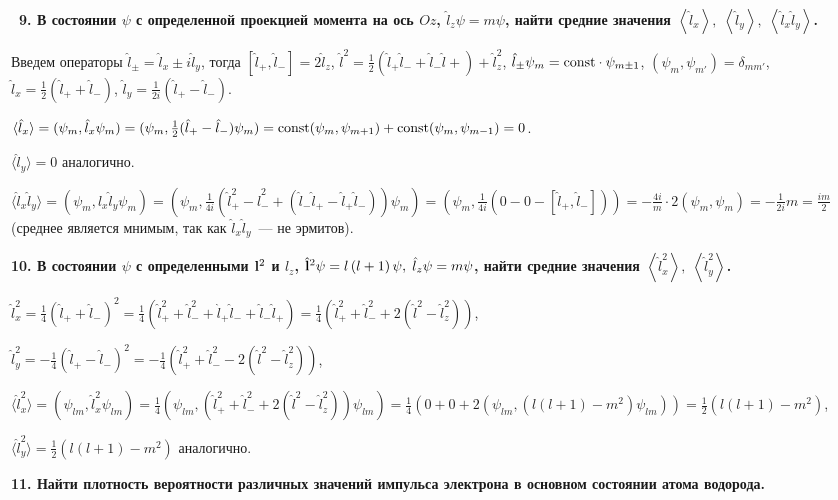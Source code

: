 \documentclass[a4paper,12pt]{article}
\begin{document}
\noindent\textbf{~9. В состоянии $\psi $ с определенной проекцией момента
на ось $Oz$, $\hat{l}_z \psi = m\psi$, найти средние значения
$\left\langle {\hat {l}_x } \right\rangle ,\;\left\langle {\hat
{l}_y } \right\rangle ,\;\left\langle {\hat {l}_x \hat {l}_y }
\right\rangle $.}

Введем операторы $\hat l_\pm=\hat l_x\pm i\hat l_y$, тогда
$[\hat l_+,\hat l_-]=2\hat l_z$,
$\hat l^2=\frac12(\hat l_+\hat l_-+\hat l_-\hat l+)+\hat l_z^2$,
$\hat l_\pm\psi_m=\mathord{\rm const}\cdot\psi_{m\pm1}$,
$(\psi_m,\psi_{m'})=\delta_{mm'}$,
$\hat l_x=\frac12(\hat l_++\hat l_-)$,
$\hat l_y=\frac1{2i}(\hat l_+-\hat l_-)$.

$\langle\hat l_x\rangle=(\psi_m,\hat l_x\psi_m)=
  (\psi_m,\frac12(\hat l_+-\hat l_-)\psi_m)=
  \mathord{\rm const}(\psi_m,\psi_{m+1})+
  \mathord{\rm const}(\psi_m,\psi_{m-1})=0$.

$\langle\hat l_y\rangle=0$ аналогично.

$\langle\hat l_x\hat l_y\rangle=(\psi_m,\hat l_x\hat l_y\psi_m)=
  (\psi_m,\frac1{4i}(\hat l_+^2-\hat l_-^2+
    (\hat l_-\hat l_+-\hat l_+\hat l_-))\psi_m)=
  (\psi_m,\frac1{4i}(0-0-[\hat l_+,\hat l_-]))=
  -\frac{4i}m\cdot2(\psi_m,\psi_m)=-\frac1{2i}m=\frac{im}2$
(среднее является мнимым, так как $\hat l_x\hat l_y$~--- не эрмитов).

\noindent\textbf{10. В состоянии $\psi $ с определенными ${\bf l}^2$ и
$l_z $, $\hat {\bf l}^2\psi = l\left( {l + 1} \right)\psi ,\;\hat
{l}_z \psi = m\psi $, найти средние значения $\left\langle {\hat
{l}_x^2 } \right\rangle ,\;\left\langle {\hat {l}_y^2 }
\right\rangle $.}

$\hat l_x^2=\frac14(\hat l_++\hat l_-)^2=
  \frac14(\hat l_+^2+\hat l_-^2+\hat l_+\hat l_-+\hat l_-\hat l_+)=
  \frac14(\hat l_+^2+\hat l_-^2+2(\hat l^2-\hat l_z^2))$,

$\hat l_y^2=-\frac14(\hat l_+-\hat l_-)^2=
  -\frac14(\hat l_+^2+\hat l_-^2-2(\hat l^2-\hat l_z^2))$,

$\langle\hat l_x^2\rangle=(\psi_{lm},\hat l_x^2\psi_{lm})=
  \frac14(\psi_{lm},(\hat l_+^2+\hat l_-^2+2(\hat l^2-\hat l_z^2))\psi_{lm})=
  \frac14(0+0+2(\psi_{lm},(l(l+1)-m^2)\psi_{lm}))=\frac12(l(l+1)-m^2)$,

$\langle\hat l_y^2\rangle=\frac12(l(l+1)-m^2)$ аналогично.

\noindent\textbf{11. Найти плотность вероятности различных значений
импульса электрона в основном состоянии атома водорода.}
\end{document}
